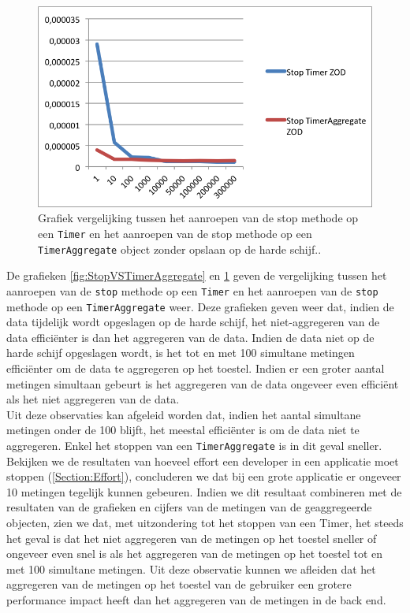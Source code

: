 \begin{figure}[h]
  \centering
  \includegraphics[scale=1.0]{Afbeeldingen/Evaluatie/StopVSTimerAggregateZOD}
  \caption{Grafiek vergelijking tussen het aanroepen van de stop methode op een \texttt{Timer} en het aanroepen van de stop methode op een \texttt{TimerAggregate} object zonder opslaan op de harde schijf..}
  \label{fig:StopVSTimerAggregateZOD}
\end{figure}
De grafieken \ref{fig:StopVSTimerAggregate} en \ref{fig:StopVSTimerAggregateZOD} geven de vergelijking tussen het aanroepen van de \texttt{stop} methode op een \texttt{Timer} en het aanroepen van de \texttt{stop} methode op een \texttt{TimerAggregate} weer. Deze grafieken geven weer dat, indien de data tijdelijk wordt opgeslagen op de harde schijf, het niet-aggregeren van de data effici\"enter is dan het aggregeren van de data. Indien de data niet op de harde schijf opgeslagen wordt, is het tot en met 100 simultane metingen effici\"enter om de data te aggregeren op het toestel. Indien er een groter aantal metingen simultaan gebeurt is het aggregeren van de data ongeveer even effici\"ent als het niet aggregeren van de data. \\

Uit deze observaties kan afgeleid worden dat, indien het aantal simultane metingen onder de 100 blijft, het meestal effici\"enter is om de data niet te aggregeren. Enkel het stoppen van een \texttt{TimerAggregate} is in dit geval sneller. \\


Bekijken we de resultaten van hoeveel effort een developer in een applicatie moet stoppen (\ref{Section:Effort}), concluderen we dat bij een grote applicatie er ongeveer 10 metingen tegelijk kunnen gebeuren. Indien we dit resultaat combineren met de resultaten van de grafieken en cijfers van de metingen van de geaggregeerde objecten, zien we dat, met uitzondering tot het stoppen van een Timer, het steeds het geval is dat het niet aggregeren van de metingen op het toestel sneller of ongeveer even snel is als het aggregeren van de metingen op het toestel tot en met 100 simultane metingen. Uit deze observatie kunnen we afleiden dat het aggregeren van de metingen op het toestel van de gebruiker een grotere performance impact heeft dan het aggregeren van de metingen in de back end. \\

